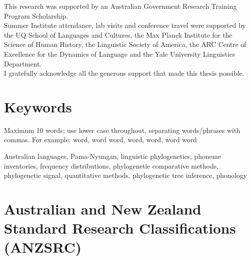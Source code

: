
This research was supported by an Australian Government Research Training Program Scholarship.\\

\noindent
Summer Institute attendance, lab visits and conference travel were supported by the UQ School of Languages and Cultures, the Max Planck Institute for the Science of Human History, the Linguistic Society of America, the ARC Centre of Excellence for the Dynamics of Language and the Yale University Linguistics Department.\\

\noindent
I gratefully acknowledge all the generous support that made this thesis possible.



\section*{Keywords}

\begin{instructional}
	Maximum 10 words; use lower case throughout, separating words/phrases with commas. For example: word, word word, word, word, word word
\end{instructional}

Australian languages, Pama-Nyungan, linguistic phylogenetics, phoneme inventories, frequency distributions, phylogenetic comparative methods, phylogenetic signal, quantitative methods, phylogenetic tree inference, phonology



\section*{Australian and New Zealand Standard Research Classifications (ANZSRC)}

